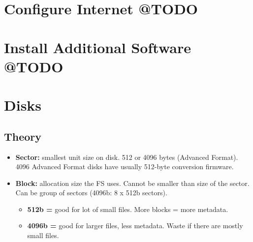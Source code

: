 \documentclass[10pt, a4paper, onecolumn, oneside, titlepage, openany]{book}
\begin{document}
\section{Configure Internet @TODO}


\section{Install Additional Software @TODO}


\section{Disks}
\subsection{Theory}
\begin{itemize}
    \item \textbf{Sector:} smallest unit size on disk. 512 or 4096 bytes (Advanced Format). 4096 Advanced Format disks have usually 512-byte conversion firmware.
    \item \textbf{Block:} allocation size the FS uses. Cannot be smaller than size of the sector. Can be group of sectors (4096b: 8 x 512b sectors).
    \begin{itemize}
        \item \textbf{512b =} good for lot of small files. More blocks = more metadata.
        \item \textbf{4096b =}  good for larger files, less metadata. Waste if there are mostly small files.
    \end{itemize}
\end{itemize}
\end{document}
